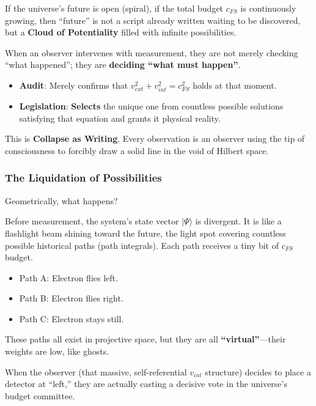 If the universe's future is open (spiral), if the total budget $c_{FS}$ is continuously growing, then ``future'' is not a script already written waiting to be discovered, but a \textbf{Cloud of Potentiality} filled with infinite possibilities.

When an observer intervenes with measurement, they are not merely checking ``what happened''; they are \textbf{deciding ``what must happen''}.

\begin{itemize}
\item \textbf{Audit}: Merely confirms that $v_{ext}^2 + v_{int}^2 = c_{FS}^2$ holds at that moment.

\item \textbf{Legislation}: \textbf{Selects} the unique one from countless possible solutions satisfying that equation and grants it physical reality.
\end{itemize}

This is \textbf{Collapse as Writing}. Every observation is an observer using the tip of consciousness to forcibly draw a solid line in the void of Hilbert space.

\subsubsection{The Liquidation of Possibilities}

Geometrically, what happens?

Before measurement, the system's state vector $|\Psi\rangle$ is divergent. It is like a flashlight beam shining toward the future, the light spot covering countless possible historical paths (path integrals). Each path receives a tiny bit of $c_{FS}$ budget.

\begin{itemize}
\item Path A: Electron flies left.

\item Path B: Electron flies right.

\item Path C: Electron stays still.
\end{itemize}

These paths all exist in projective space, but they are all \textbf{``virtual''}---their weights are low, like ghosts.

When the observer (that massive, self-referential $v_{int}$ structure) decides to place a detector at ``left,'' they are actually casting a decisive vote in the universe's budget committee.

